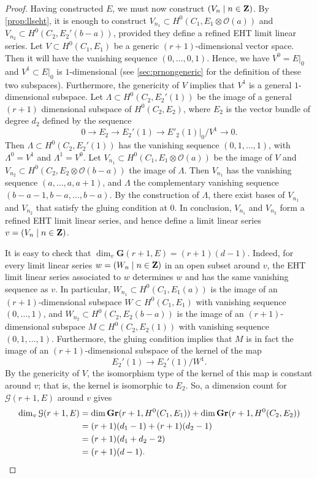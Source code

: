 \documentclass[11pt,reqno]{amsart}
\theoremstyle{plain}
\theoremstyle{definition}
\theoremstyle{remark}
\numberwithin{equation}{section}
\renewcommand{\to}{{\longrightarrow}}
\numberwithin{equation}{section}
\renewcommand{\O}{\mathcal O}
\newcommand{\G}{\mathbf G}
\begin{document}
\begin{proof}
  Having constructed $E$, we must now construct $(V_n \mid n \in {\bf Z})$.
  By \autoref{prop:llseht}, it is enough to construct $V_{n_1} \subset H^0(C_1, E_1 \otimes \O(a))$ and $V_{n_2} \subset H^0(C_2, E_2'(b-a))$, provided they define a refined EHT limit linear series.
  Let $V \subset H^0(C_1, E_1)$ be a generic $(r+1)$-dimensional vector space.
  Then it will have the vanishing sequence $(0, \dots, 0, 1)$.
  Hence, we have $V^0 = E|_0$ and $V^1 \subset E|_0$ is $1$-dimensional (see \autoref{sec:prnongeneric} for the definition of these two subspaces).
  Furthermore, the genericity of $V$ implies that $V^1$ is a general $1$-dimensional subspace.
  Let $\Lambda \subset H^0(C_2, E_2'(1))$ be the image of a general $(r+1)$ dimensional subspace of $H^0(C_2, E_2)$, where $E_2$ is the vector bundle of degree $d_2$ defined by the sequence
  \[ 0 \to E_2 \to E_2'(1) \to E'_2(1)|_0 / V^1 \to 0.\]
  Then $\Lambda \subset H^0(C_2, E_2'(1))$ has the vanishing sequence $(0, 1, \dots, 1)$, with $\Lambda^0 = V^1$ and $\Lambda^1 = V^0$.
  Let $V_{n_1} \subset H^0(C_1, E_1 \otimes \O(a))$ be the image of $V$ and $V_{n_2} \subset H^0(C_2,E_2 \otimes \O(b-a))$ the image of $\Lambda$.
  Then $V_{n_1}$ has the vanishing sequence $(a, \dots, a, a+1)$, and $\Lambda$ the complementary vanishing sequence $(b-a-1, b-a, \dots, b-a)$.
  By the construction of $\Lambda$, there exist bases of $V_{n_1}$ and $V_{n_2}$ that satisfy the gluing condition at $0$.
  In conclusion, $V_{n_1}$ and $V_{n_2}$ form a refined EHT limit linear series, and hence define a limit linear series $v = (V_n \mid n \in {\bf Z})$.

  It is easy to check that $\dim_v \G(r+1, E) = (r+1)(d-1)$.
  Indeed, for every limit linear series $w = (W_n \mid n \in {\bf Z})$ in an open subset around $v$, the EHT limit linear series associated to $w$ determines $w$ and has the same vanishing sequence as $v$.
  In particular, $W_{n_1} \subset H^0(C_1, E_1(a))$ is the image of an $(r+1)$-dimensional subspace $W \subset H^0(C_1, E_1)$ with vanishing sequence $(0, \dots, 1)$, and $W_{n_2} \subset H^0(C_2, E_2(b-a))$ is the image of an $(r+1)$-dimensional subspace $M \subset H^0(C_2, E_2(1))$ with vanishing sequence $(0,1,\dots,1)$.
  Furthermore, the gluing condition implies that $M$ is in fact the image of an $(r+1)$-dimensional subspace of the kernel of the map
  \[ E_2'(1) \to E_2'(1)/W^1.\]
  By the genericity of $V$, the isomorphism type of the kernel of this map is constant around $v$; that is, the kernel is isomorphic to $E_2$.
  So, a dimension count for $\mathcal G(r+1, E)$ around $v$ gives
  \begin{align*}
    \dim_v \mathcal G(r+1, E) &= \dim {\bf Gr}(r+1, H^0(C_1, E_1)) + \dim {\bf Gr}(r+1, H^0(C_2, E_2))\\
                              &= (r+1)(d_1-1) + (r+1)(d_2-1)\\
                              &= (r+1)(d_1+d_2-2)\\
                              &= (r+1)(d-1).\\
  \end{align*}


\end{proof}
\end{document}
